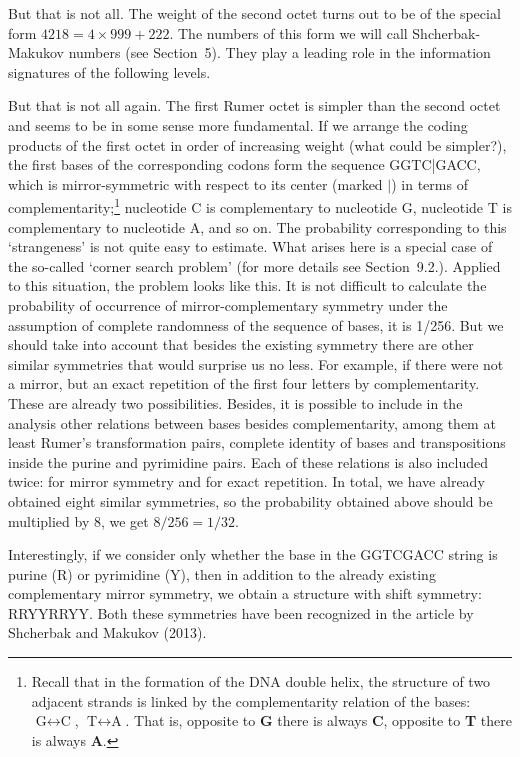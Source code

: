 \documentclass[12pt]{article}
\begin{document}
But that is not all. The weight of the second octet turns out to be of the special form $4218 = 4 \times 999 + 222$. The numbers of this form we will call Shcherbak-Makukov numbers (see Section~5). They play a leading role in the information signatures of the following levels.

But that is not all again. The first Rumer octet is simpler than the second octet and seems to be in some sense more fundamental. If we arrange the coding products of the first octet in order of increasing weight (what could be simpler?), the first bases of the corresponding codons form the sequence GGTC|GACC, which is mirror-symmetric with respect to its center (marked $|$) in terms of complementarity;\footnote{Recall that in the formation of the DNA double helix, the structure of two adjacent strands is linked by the complementarity relation of the bases: $\text{G} \leftrightarrow \text{C}$, $\text{T} \leftrightarrow \text{A}$. That is, opposite to \textbf{G} there is always \textbf{C}, opposite to \textbf{T} there is always \textbf{A}.} nucleotide C is complementary to nucleotide G, nucleotide T is complementary to nucleotide A, and so on. The probability corresponding to this `strangeness' is not quite easy to estimate. What arises here is a special case of the so-called `corner search problem' (for more details see Section~9.2.). Applied to this situation, the problem looks like this. It is not difficult to calculate the probability of occurrence of mirror-complementary symmetry under the assumption of complete randomness of the sequence of bases, it is 1/256. But we should take into account that besides the existing symmetry there are other similar symmetries that would surprise us no less. For example, if there were not a mirror, but an exact repetition of the first four letters by complementarity. These are already two possibilities. Besides, it is possible to include in the analysis other relations between bases besides complementarity, among them at least Rumer's transformation pairs, complete identity of bases and transpositions inside the purine and pyrimidine pairs. Each of these relations is also included twice: for mirror symmetry and for exact repetition. In total, we have already obtained eight similar symmetries, so the probability obtained above should be multiplied by 8, we get $8/256 = 1/32$.

Interestingly, if we consider only whether the base in the GGTCGACC string is purine (R) or pyrimidine (Y), then in addition to the already existing complementary mirror symmetry, we obtain a structure with shift symmetry: RRYYRRYY. Both these symmetries have been recognized in the article by Shcherbak and Makukov (2013).
\end{document}
